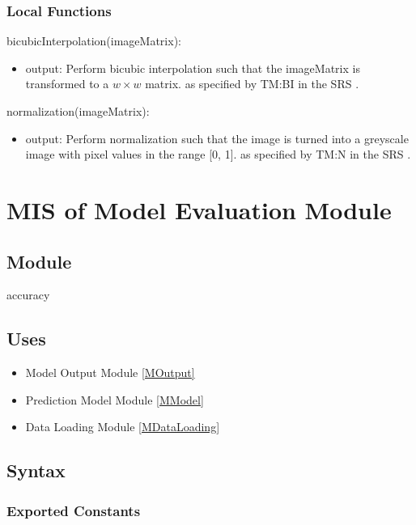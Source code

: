 \documentclass[12pt, titlepage]{article}
\begin{document}
\subsubsection{Local Functions}

\noindent bicubicInterpolation(imageMatrix):
\begin{itemize}
\item output: Perform bicubic interpolation such that the imageMatrix is
transformed to a ${w \times w}$ matrix. as specified by TM:BI in the SRS \citep[4.2.2]{SRS}.
\end{itemize}
\noindent normalization(imageMatrix):
\begin{itemize}
\item output: Perform normalization such that the image is turned into a
greyscale image with pixel values in the range [0, 1]. as specified by TM:N in
the SRS \citep[4.2.2]{SRS}.
\end{itemize}

\newpage
\section{MIS of Model Evaluation Module} \label{mAccuracy}

\subsection{Module}

accuracy

\subsection{Uses}

\begin{itemize}
  \item Model Output Module \ref{MOutput}
  \item Prediction Model Module \ref{MModel}
  \item Data Loading Module \ref{MDataLoading}
\end{itemize}

\subsection{Syntax}

\subsubsection{Exported Constants}
\end{document}
